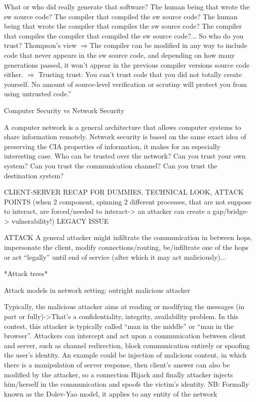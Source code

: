 What or who did really generate that software? The human being that wrote the sw source code? The compiler that compiled the sw source code? The human being that wrote the compiler that compiles the sw source code? The compiler that compiles the compiler that compiled the sw source code?...
So who do you trust?
Thompson’s view $\Rightarrow$The compiler can be modified in any way to include
code that never appears in the sw source code, and depending on how many generations passed, it won’t appear in the previous compiler versions source code either.
$\Rightarrow$ Trusting trust: You can't trust code that you did not totally create yourself. No	
amount of source-level verification or scrutiny will protect you from using untrusted code.”


Computer Security vs Network Security

A computer network is a general architecture that allows computer systems to share information remotely. Network security is based on the same exact idea of preserving the CIA properties of information, it makes for an especially interesting case.
Who can be trusted over the network? Can you trust your own system? Can you trust the communication channel? Can you trust the destination system?


CLIENT-SERVER RECAP FOR DUMMIES, TECHNICAL LOOK, ATTACK POINTS (when 2 component, spinning 2 different processes, that are not suppose to interact, are forced/needed to interact-> an attacker can create a gap/bridge-> vulnerability!) LEGACY ISSUE



ATTACK
A general attacker might infiltrate the communication in between hops, impersonate the client, modify connections/routing, be/infiltrate one of the hops or act “legally” until end of service (after which it may act maliciously)...


*Attack trees*


Attack models in network setting: outright malicious attacker

Typically, the malicious attacker aims at reading or modifying the messages (in part or fully)->That’s a confidentiality, integrity, availability problem.
In this contest, this attacker is typically called “man in the middle” or “man in the browser”. Attackers can intercept and act upon a communication between client and server, such as channel redirection, block communication entirely or spoofing the user’s identity.
An example could be injection of malicious content, in which there is a manipulation of server response, then client’s answer can also be modified by the attacker, so a connection Hijack and finally attacker injects him/herself in the communication and spoofs the victim’s identity.
NB: Formally known as the Dolev-Yao model, it applies to any entity of the network

